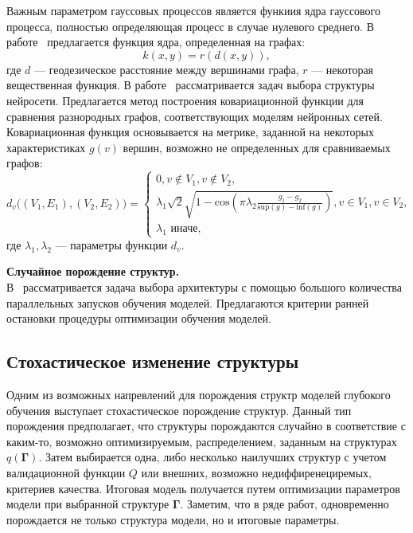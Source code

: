 Важным параметром гауссовых процессов является функиия ядра гауссового процесса, полностью определяющая процесс в случае нулевого среднего. В работе~\cite{gp_fusion} предлагается функция ядра, определенная на графах:
    \[
    k(x,y) = r(d(x,y)),
    \]
где $d$ --- геодезическое расстояние между вершинами графа, $r$ --- некоторая вещественная функция.
В работе~\cite{gp_arc} рассматривается задач выбора структуры нейросети. Предлагается метод построения ковариационной функции для сравнения разнородных графов, соответствующих моделям нейронных сетей. Ковариационная функция основывается на метрике, заданной на некоторых характеристиках $g(v)$ вершин, возможно не определенных для сравниваемых графов:
\[
    d_v\bigl( (V_1, E_1), (V_2,E_2) \bigr) = \begin{cases}
    0, v \not \in V_1, v \not \in V_2,\\    
    \lambda_1\sqrt{2}\sqrt{1- \text{cos}(\pi\lambda_2\frac{g_1 - g_2}{\text{sup}(g) - \text{inf}(g) })}, v \in V_1, v \in V_2,\\
    \lambda_1 \text{ иначе,}
    \end{cases}
\]
где $\lambda_1, \lambda_2$ --- параметры функции $d_v$.

\par{\textbf{Случайное порождение структур. }}\\

В~\cite{optimal_racing} рассматривается задача выбора архитектуры с помощью большого количества параллельных запусков обучения моделей. Предлагаются критерии ранней остановки процедуры оптимизации обучения моделей.


\subsection*{Стохастическое изменение структуры}
Одним из возможных напревлений для порождения структр моделей глубокого обучения выступает стохастическое порождение структур.
Данный тип порождения предполагает, что структуры порождаются случайно в соответствие с каким-то, возможно оптимизируемым, распределением, заданным на структурах $q(\boldsymbol{\Gamma})$. Затем выбирается одна, либо несколько наилучших структур с учетом валидационной функции $Q$ или внешних, возможно недиффиренециремых, критериев качества. Итоговая модель получается путем оптимизации параметров модели при выбранной структуре $\boldsymbol{\Gamma}$. 
Заметим, что в ряде работ, одновременно порождается не только структура модели, но и итоговые параметры.


